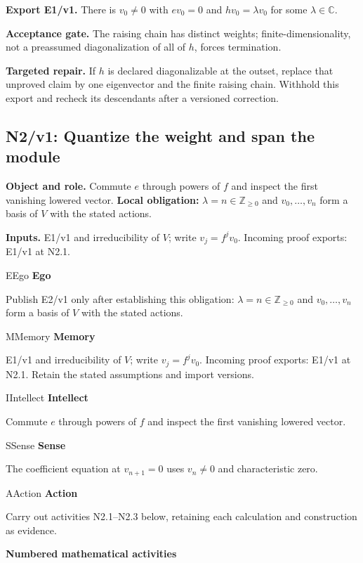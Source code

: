 \documentclass[preprint,12pt,aps,pra,showkeys,amsmath,amssymb,superscriptaddress,floatfix]{revtex4-2}
\theoremstyle{definition}
\theoremstyle{remark}
\newcommand{\mmfaculty}[3]{%
 \begin{mmfacultybox}{#1}{#2}
 {\sffamily\bfseries\color{MMBlue}#2}\par\smallskip #3
 \end{mmfacultybox}}
\newcommand{\field}[2]{\par\smallskip\noindent\textbf{#1.} #2\par}
\begin{document}
\field{Export E1/v1}{There is \(v_0\ne0\) with \(ev_0=0\) and \(hv_0=\lambda v_0\) for some
\(\lambda\in\mathbb C\).}

\field{Acceptance gate}{The raising chain has distinct weights; finite-dimensionality, not a
preassumed diagonalization of all of \(h\), forces termination.}

\field{Targeted repair}{If \(h\) is declared diagonalizable at the outset, replace that unproved
claim by one eigenvector and the finite raising chain. Withhold this
export and recheck its descendants after a versioned correction.}

\clearpage

\subsection{N2/v1: Quantize the weight and span the module}

\field{Object and role}{Commute \(e\) through powers of \(f\) and inspect the first vanishing
lowered vector. \textbf{Local obligation:}
\(\lambda=n\in\mathbb Z_{\ge0}\) and \(v_0,\ldots,v_n\) form a basis of
\(V\) with the stated actions.}

\field{Inputs}{E1/v1 and irreducibility of \(V\); write \(v_j=f^jv_0\). Incoming proof
exports: E1/v1 at N2.1.}

\mmfaculty{E}{Ego}{Publish E2/v1 only after establishing this obligation:
\(\lambda=n\in\mathbb Z_{\ge0}\) and \(v_0,\ldots,v_n\) form a basis of
\(V\) with the stated actions.}

\mmfaculty{M}{Memory}{E1/v1 and irreducibility of \(V\); write \(v_j=f^jv_0\). Incoming proof
exports: E1/v1 at N2.1. Retain the stated assumptions and import
versions.}

\mmfaculty{I}{Intellect}{Commute \(e\) through powers of \(f\) and inspect the first vanishing
lowered vector.}

\mmfaculty{S}{Sense}{The coefficient equation at \(v_{n+1}=0\) uses \(v_n\ne0\) and
characteristic zero.}

\mmfaculty{A}{Action}{Carry out activities N2.1--N2.3 below, retaining each calculation and
construction as evidence.}

\smallskip\noindent\textbf{Numbered mathematical activities}
\end{document}

